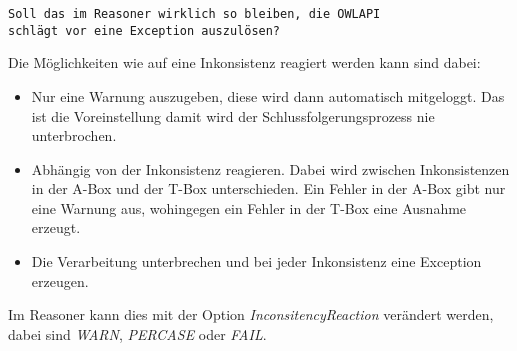 \begin{verbatim}
Soll das im Reasoner wirklich so bleiben, die OWLAPI
schlägt vor eine Exception auszulösen?
\end{verbatim}

Die Möglichkeiten wie auf eine Inkonsistenz reagiert werden kann sind dabei:
\begin{itemize}
  \item Nur eine Warnung auszugeben, diese wird dann automatisch mitgeloggt. Das ist die Voreinstellung damit wird der Schlussfolgerungsprozess nie unterbrochen.
  \item Abhängig von der Inkonsistenz reagieren. Dabei wird zwischen Inkonsistenzen in der A-Box und der T-Box unterschieden. Ein Fehler in der A-Box gibt nur eine Warnung aus, wohingegen ein Fehler in der T-Box eine Ausnahme erzeugt.
  \item Die Verarbeitung unterbrechen und bei jeder Inkonsistenz eine Exception erzeugen.
\end{itemize}

Im Reasoner kann dies mit der Option \emph{InconsitencyReaction} verändert werden, dabei sind \emph{WARN}, \emph{PERCASE} oder \emph{FAIL}.

